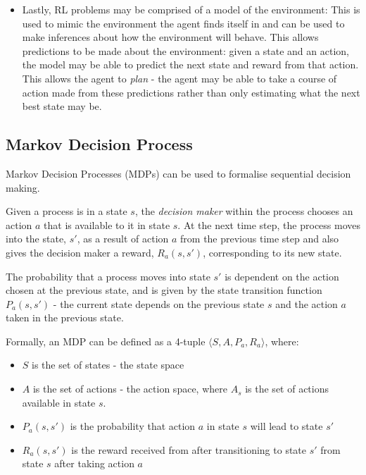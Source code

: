 \documentclass{article}
\begin{document}
\begin{itemize}
    \item Lastly, RL problems may be comprised of a model of the environment: This is used to mimic the environment the agent finds itself in and can be used to make inferences about how the environment will behave. This allows predictions to be made about the environment: given a state and an action, the model may be able to predict the next state and reward from that action. This allows the agent to \textit{plan} - the agent may be able to take a course of action made from these predictions rather than only estimating what the next best state may be.
    
\end{itemize}


\subsection{Markov Decision Process}

Markov Decision Processes (MDPs) can be used to formalise sequential decision making. 

Given a process is in a state $s$, the \textit{decision maker} within the process chooses an action $a$ that is available to it in state $s$. At the next time step, the process moves into the state, $s'$, as a result of action $a$ from the previous time step and also gives the decision maker a reward, $R_{a}(s, s')$, corresponding to its new state.

The probability that a process moves into state $s'$ is dependent on the action chosen at the previous state, and is given by the state transition function $P_{a}(s, s')$ - the current state depends on the previous state $s$ and the action $a$ taken in the previous state. 

Formally, an MDP can be defined as a 4-tuple $\langle S, A, P_a, R_a \rangle $, where: 

\begin{itemize}
    \item $S$ is the set of states - the state space
    
    \item $A$ is the set of actions - the action space, where $A_s$ is the set of actions available in state $s$.
    
    \item $P_{a}(s, s')$ is the probability that action $a$ in state $s$ will lead to state $s'$
    
    \item $R_{a}(s, s')$ is the reward received from after transitioning to state $s'$ from state $s$ after taking action $a$
\end{itemize}
\end{document}
